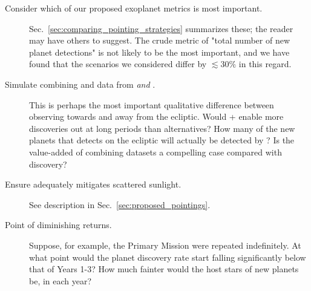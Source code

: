 \begin{description}
	\item[Consider which of our proposed exoplanet metrics is most important.]
	Sec.~\ref{sec:comparing_pointing_strategies} summarizes these; the reader 
	may have others to suggest. The crude metric of "total number of new planet 
	detections" is not
	likely to be the most important, and we have found that the scenarios we considered
	differ by $\lesssim30\%$ in
          this regard. 
	
	\item[Simulate combining \tess and \ktwo data from
          \rm{\elong\:} \textit{and} \rm{\eshort}.]  This is perhaps
          the most important qualitative difference between observing
          towards and away from the ecliptic.  Would \tess\!+\ktwo
          enable more discoveries out at long periods than
          alternatives?  How many of the new planets that \tess
          detects on the ecliptic will actually be detected by \ktwo?
          Is the value-added of combining datasets a compelling case
          compared with discovery?
          
    \item[Ensure {\rm \npole} adequately mitigates scattered sunlight.]
    See description in Sec.~\ref{sec:proposed_pointings}.
	
    \item[Point of diminishing returns.] Suppose, for example, the Primary Mission were repeated indefinitely.
    At what point would the planet discovery rate start falling significantly below that of Years 1-3?
    How much fainter would the host stars of new planets be, in each year?
	
\end{description}
